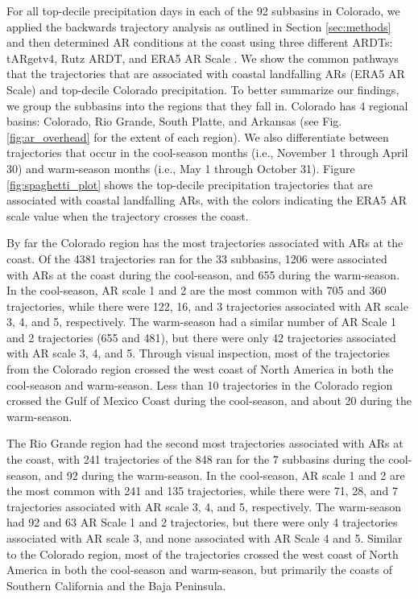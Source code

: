 \documentclass[draft]{agujournal2019}
\begin{document}
For all top-decile precipitation days in each of the 92 subbasins in Colorado, we applied the backwards trajectory analysis as outlined in Section \ref{sec:methods} and then determined AR conditions at the coast using three different ARDTs: tARgetv4, Rutz ARDT, and ERA5 AR Scale \cite{MartinRalph2019, Rutz2014, Guan2024AERA5}. We show the common pathways that the trajectories that are associated with coastal landfalling ARs (ERA5 AR Scale) and top-decile Colorado precipitation. To better summarize our findings, we group the subbasins into the regions that they fall in. Colorado has 4 regional basins: Colorado, Rio Grande, South Platte, and Arkansas (see Fig. \ref{fig:ar_overhead} for the extent of each region). We also differentiate between trajectories that occur in the cool-season months (i.e., November 1 through April 30) and warm-season months (i.e., May 1 through October 31). Figure \ref{fig:spaghetti_plot} shows the top-decile precipitation trajectories that are associated with coastal landfalling ARs, with the colors indicating the ERA5 AR scale value when the trajectory crosses the coast. 

By far the Colorado region has the most trajectories associated with ARs at the coast. Of the 4381 trajectories ran for the 33 subbasins, 1206 were associated with ARs at the coast during the cool-season, and 655 during the warm-season. In the cool-season, AR scale 1 and 2 are the most common with 705 and 360 trajectories, while there were 122, 16, and 3 trajectories associated with AR scale 3, 4, and 5, respectively. The warm-season had a similar number of AR Scale 1 and 2 trajectories (655 and 481), but there were only 42 trajectories associated with AR scale 3, 4, and 5. Through visual inspection, most of the trajectories from the Colorado region crossed the west coast of North America in both the cool-season and warm-season. Less than 10 trajectories in the Colorado region crossed the Gulf of Mexico Coast during the cool-season, and about 20 during the warm-season. 

The Rio Grande region had the second most trajectories associated with ARs at the coast, with 241 trajectories of the 848 ran for the 7 subbasins during the cool-season, and 92 during the warm-season. In the cool-season, AR scale 1 and 2 are the most common with 241 and 135 trajectories, while there were 71, 28, and 7 trajectories associated with AR scale 3, 4, and 5, respectively. The warm-season had 92 and 63 AR Scale 1 and 2 trajectories, but there were only 4 trajectories associated with AR scale 3, and none associated with AR Scale 4 and 5. Similar to the Colorado region, most of the trajectories crossed the west coast of North America in both the cool-season and warm-season, but primarily the coasts of Southern California and the Baja Peninsula. 
\end{document}
